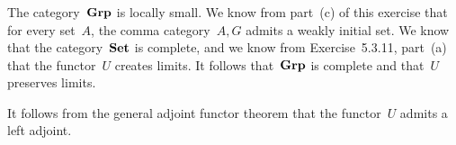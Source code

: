 \subsubsection{}

The category~$\mathbf{Grp}$ is locally small.
We know from part~(c) of this exercise that for every set~$A$, the comma category~$A \comma G$ admits a weakly initial set.
We know that the category~$\mathbf{Set}$ is complete, and we know from Exercise~5.3.11, part~(a) that the functor~$U$ creates limits.
It follows that~$\mathbf{Grp}$ is complete and that~$U$ preserves limits.

It follows from the general adjoint functor theorem that the functor~$U$ admits a left adjoint.
